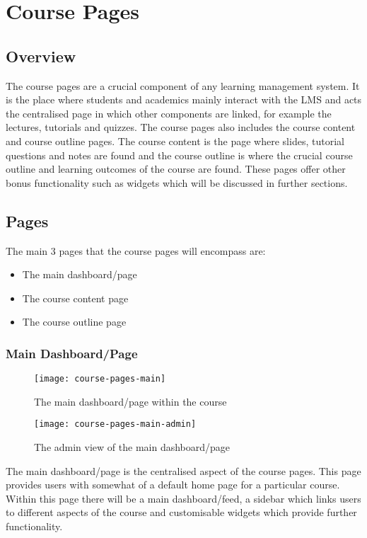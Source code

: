 \section{Course Pages}
\subsection{Overview}
The course pages are a crucial component of any learning management system. It is the place where students and academics mainly interact with the LMS and acts the centralised page in which other components are linked, for example the lectures, tutorials and quizzes. 
The course pages also includes the course content and course outline pages. The course content is the page where slides, tutorial questions and notes are found and the course outline is where the crucial course outline and learning outcomes of the course are found.
These pages offer other bonus functionality such as widgets which will be discussed in further sections.

\subsection{Pages}
The main 3 pages that the course pages will encompass are:
\begin{itemize}
    \item The main dashboard/page
    \item The course content page
    \item The course outline page
\end{itemize}

\subsubsection{Main Dashboard/Page}
\begin{figure}[h]
    \centering
    \texttt{[image: course-pages-main]}
    \caption{The main dashboard/page within the course}
\end{figure}
\begin{figure}[h]
    \centering
    \texttt{[image: course-pages-main-admin]}
    \caption{The admin view of the main dashboard/page}
\end{figure}
The main dashboard/page is the centralised aspect of the course pages.
This page provides users with somewhat of a default home page for a particular course.
Within this page there will be a main dashboard/feed, a sidebar which links users to different aspects of the course and customisable widgets which provide further functionality. 

